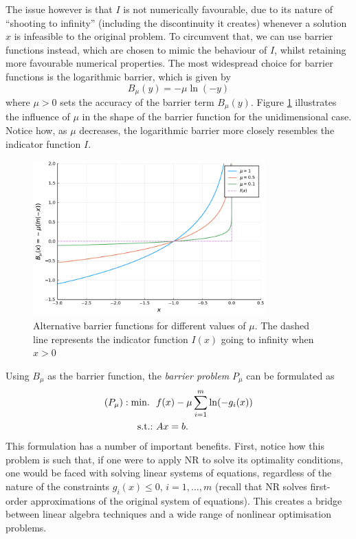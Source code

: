 The issue however is that $I$ is not numerically favourable, due to its nature of ``shooting to infinity'' (including the discontinuity it creates) whenever a solution $x$ is infeasible to the original problem. To circumvent that, we can use barrier functions instead, which are chosen to mimic the behaviour of $I$, whilst retaining more favourable numerical properties. The most widespread choice for barrier functions is the logarithmic barrier, which is given by
	\begin{equation*}
		B_\mu(y) = -\mu \ln(-y)
	\end{equation*}
	where $\mu > 0$ sets the accuracy of the barrier term $B_\mu(y)$. Figure \ref{p1c7:fig:barrier_function} illustrates the influence of $\mu$ in the shape of the barrier function for the unidimensional case. Notice how, as $\mu$ decreases, the logarithmic barrier more closely resembles the indicator function $I$.
	
\begin{figure}
	\includegraphics[width=0.8\textwidth]{part_1/chapter_7/figures/different_mu.pdf}
	\caption{Alternative barrier functions for different values of $\mu$. The dashed line represents the indicator function $I(x)$ going to infinity when $x > 0$} \label{p1c7:fig:barrier_function}
\end{figure}

Using $B_\mu$ as the barrier function, the \emph{barrier problem} $P_\mu$ can be formulated as
	\begin{align*}
		(P_\mu) : \mathop{\text{min.~}} \ &f(x) - \mu \sum_{i=1}^m\ln(-g_i(x)) \\
		\mathop{\text{s.t.:~}} & Ax = b.
	\end{align*}
	This formulation has a number of important benefits. First, notice how this problem is such that, if one were to apply NR to solve its optimality conditions, one would be faced with solving linear systems of equations, regardless of the nature of the constraints $g_i(x) \le 0$, $i = 1,\dots, m$ (recall that NR solves first-order approximations of the original system of equations). This creates a bridge between linear algebra techniques and a wide range of nonlinear optimisation problems. 
	
